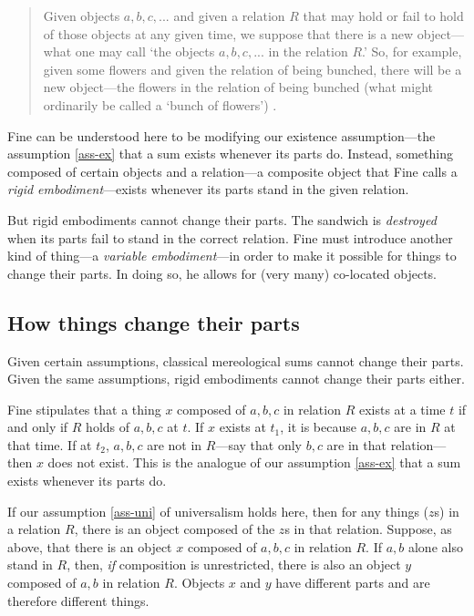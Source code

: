 \documentclass[12pt,twoside]{reedfancy}
\begin{document}
\begin{spacing}{1.25}
\begin{quote}
Given objects $a, b, c, ... $ and given a relation $R$ that
may hold or fail to hold of those objects at any given time, we
suppose that there is a new object---what one may call `the objects
$a, b, c, ... $ in the relation $R$.'  So, for example,
given some flowers and given the relation of being bunched, there will
be a new object---the flowers in the relation of being bunched (what
might ordinarily be called a `bunch of flowers')
\citeyearpar[65]{fine1999}.
\end{quote}

Fine can be understood here to be modifying our existence
assumption---the assumption \ref{ass-ex} that a sum exists whenever
its parts do.  Instead, something composed of certain objects and a
relation---a composite object that Fine calls a {\em rigid
  embodiment}---exists whenever its parts stand in the given relation.

But rigid embodiments cannot change their parts.  The sandwich is {\em
  destroyed} when its parts fail to stand in the correct relation.
Fine must introduce another kind of thing---a {\em variable
  embodiment}---in order to make it possible for things to change
their parts.  In doing so, he allows for (very many) co-located
objects.

\subsection{How things change their parts}
\label{h-part}
Given certain assumptions, classical mereological sums cannot change
their parts.  Given the same assumptions, rigid embodiments cannot
change their parts either.

Fine stipulates that a thing $x$ composed of $a, b, c$ in relation $R$
exists at a time $t$ if and only if $R$ holds of $a, b, c$ at $t$.  If
$x$ exists at $t_1$, it is because $a, b, c$ are in $R$ at that time.
If at $t_2$, $a, b, c$ are not in $R$---say that only $b, c$ are in
that relation---then $x$ does not exist.  This is the analogue of our
assumption \ref{ass-ex} that a sum exists whenever its parts do.

If our assumption \ref{ass-uni} of universalism holds here, then for
any things ($z$s) in a relation $R$, there is an object composed of
the $z$s in that relation.  Suppose, as above, that there is an object
$x$ composed of $a, b, c$ in relation $R$.  If $a, b$ alone also stand
in $R$, then, {\em if} composition is unrestricted, there is also an
object $y$ composed of $a, b$ in relation $R$.  Objects $x$ and $y$
have different parts and are therefore different things.


\end{spacing}
\end{document}

